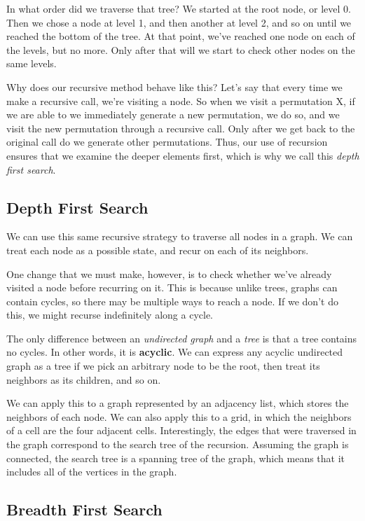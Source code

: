 In what order did we traverse that tree? We started at the root node, or level 0. Then we chose a node at level 1, and then another at level 2, and so on until we reached the bottom of the tree. At that point, we've reached one node on each of the levels, but no more. Only after that will we start to check other nodes on the same levels.

Why does our recursive method behave like this? Let's say that every time we make a recursive call, we're visiting a node. So when we visit a permutation X, if we are able to we immediately generate a new permutation, we do so, and we visit the new permutation through a recursive call. Only after we get back to the original call do we generate other permutations. Thus, our use of recursion ensures that we examine the deeper elements first, which is why we call this \textit{depth first search}.

\subsection{Depth First Search}

We can use this same recursive strategy to traverse all nodes in a graph. We can treat each node as a possible state, and recur on each of its neighbors.

One change that we must make, however, is to check whether we've already visited a node before recurring on it. This is because unlike trees, graphs can contain cycles, so there may be multiple ways to reach a node. If we don't do this, we might recurse indefinitely along a cycle.

The only difference between an \textit{undirected graph} and a \textit{tree} is that a tree contains no cycles. In other words, it is \textbf{acyclic}. We can express any acyclic undirected graph as a tree if we pick an arbitrary node to be the root, then treat its neighbors as its children, and so on.

We can apply this to a graph represented by an adjacency list, which stores the neighbors of each node. We can also apply this to a grid, in which the neighbors of a cell are the four adjacent cells. Interestingly, the edges that were traversed in the graph correspond to the search tree of the recursion. Assuming the graph is connected, the search tree is a spanning tree of the graph, which means that it includes all of the vertices in the graph.



\subsection{Breadth First Search}

